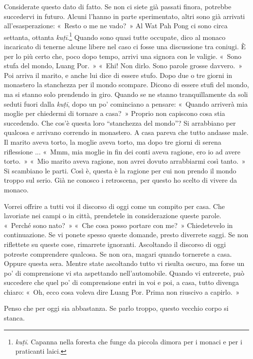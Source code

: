 Considerate questo dato di fatto. Se non ci siete già passati finora,
potrebbe succedervi in futuro. Alcuni l'hanno in parte sperimentato,
altri sono già arrivati all'esasperazione: «~Resto o me ne vado?~» Al
Wat Pah Pong ci sono circa settanta, ottanta \emph{kuṭī}.\footnote{\emph{kuṭī}.
  Capanna nella foresta che funge da piccola dimora per i monaci e per i
  praticanti laici.} Quando sono quasi tutte occupate, dico al monaco
incaricato di tenerne alcune libere nel caso ci fosse una discussione
tra coniugi. È per lo più certo che, poco dopo tempo, arrivi una signora
con le valigie. «~Sono stufa del mondo, Luang Por.~» «~Ehi! Non dirlo.
Sono parole grosse davvero.~» Poi arriva il marito, e anche lui dice di
essere stufo. Dopo due o tre giorni in monastero la stanchezza per il
mondo scompare. Dicono di essere stufi del mondo, ma si stanno solo
prendendo in giro. Quando se ne stanno tranquillamente da soli seduti
fuori dalla \emph{kuṭī}, dopo un po' cominciano a pensare: «~Quando
arriverà mia moglie per chiedermi di tornare a casa?~» Proprio non
capiscono cosa stia succedendo. Che cos'è questa loro ``stanchezza del
mondo''? Si arrabbiano per qualcosa e arrivano correndo in monastero. A
casa pareva che tutto andasse male. Il marito aveva torto, la moglie
aveva torto, ma dopo tre giorni di serena riflessione ... «~Mmm, mia
moglie in fin dei conti aveva ragione, ero io ad avere torto.~» «~Mio
marito aveva ragione, non avrei dovuto arrabbiarmi così tanto.~» Si
scambiano le parti. Così è, questa è la ragione per cui non prendo il
mondo troppo sul serio. Già ne conosco i retroscena, per questo ho
scelto di vivere da monaco.

Vorrei offrire a tutti voi il discorso di oggi come un compito per casa.
Che lavoriate nei campi o in città, prendetele in considerazione queste
parole. «~Perché sono nato?~» «~Che cosa posso portare con me?~»
Chiedetevelo in continuazione. Se vi ponete spesso queste domande,
presto diverrete saggi. Se non riflettete su queste cose, rimarrete
ignoranti. Ascoltando il discorso di oggi potreste comprendere qualcosa.
Se non ora, magari quando tornerete a casa. Oppure questa sera. Mentre
state ascoltando tutto vi risulta oscuro, ma forse un po' di
comprensione vi sta aspettando nell'automobile. Quando vi entrerete, può
succedere che quel po' di comprensione entri in voi e poi, a casa, tutto
divenga chiaro: «~Oh, ecco cosa voleva dire Luang Por. Prima non
riuscivo a capirlo.~»

Penso che per oggi sia abbastanza. Se parlo troppo, questo vecchio corpo
si stanca.

